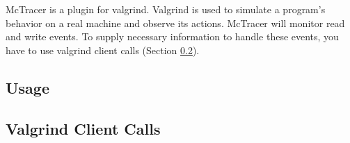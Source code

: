 McTracer is a plugin for valgrind.
Valgrind is used to simulate a program's behavior on a real machine and observe its actions.
McTracer will monitor read and write events.
To supply necessary information to handle these events, you have to use valgrind client calls (Section \ref{vgclientcalls}).
\subsection{Usage} 
\subsection{Valgrind Client Calls} \label{vgclientcalls} 
